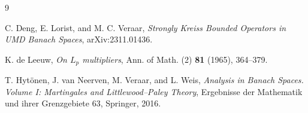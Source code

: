 \documentclass[11pt]{article}
\begin{document}
\begin{thebibliography}{9}

C. Deng, E. Lorist, and M. C. Veraar,
\emph{Strongly Kreiss Bounded Operators in UMD Banach Spaces},
arXiv:2311.01436.

K. de Leeuw,
\emph{On \(L_p\) multipliers},
Ann. of Math. (2) \textbf{81} (1965), 364--379.

T. Hyt\"onen, J. van Neerven, M. Veraar, and L. Weis,
\emph{Analysis in Banach Spaces. Volume I: Martingales and Littlewood--Paley
Theory},
Ergebnisse der Mathematik und ihrer Grenzgebiete 63, Springer, 2016.

\end{thebibliography}
\end{document}
